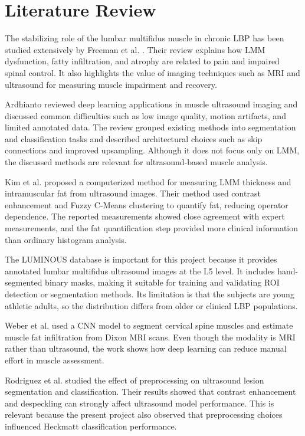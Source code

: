 ﻿\documentclass[12pt,a4paper]{report}
\begin{document}
\chapter{Literature Review}
\label{chap:literature_review}
\label{relatedwork}
The stabilizing role of the lumbar multifidus muscle in chronic LBP has been studied extensively by Freeman et al. \cite{Freeman2010}. Their review explains how LMM dysfunction, fatty infiltration, and atrophy are related to pain and impaired spinal control. It also highlights the value of imaging techniques such as MRI and ultrasound for measuring muscle impairment and recovery.

Ardhianto \cite{DeepLearningChallenges2021} reviewed deep learning applications in muscle ultrasound imaging and discussed common difficulties such as low image quality, motion artifacts, and limited annotated data. The review grouped existing methods into segmentation and classification tasks and described architectural choices such as skip connections and improved upsampling. Although it does not focus only on LMM, the discussed methods are relevant for ultrasound-based muscle analysis.

Kim et al. \cite{Kim2020} proposed a computerized method for measuring LMM thickness and intramuscular fat from ultrasound images. Their method used contrast enhancement and Fuzzy C-Means clustering to quantify fat, reducing operator dependence. The reported measurements showed close agreement with expert measurements, and the fat quantification step provided more clinical information than ordinary histogram analysis.

The LUMINOUS database \cite{Belasso2020} is important for this project because it provides annotated lumbar multifidus ultrasound images at the L5 level. It includes hand-segmented binary masks, making it suitable for training and validating ROI detection or segmentation methods. Its limitation is that the subjects are young athletic adults, so the distribution differs from older or clinical LBP populations.

Weber et al. \cite{Weber2021} used a CNN model to segment cervical spine muscles and estimate muscle fat infiltration from Dixon MRI scans. Even though the modality is MRI rather than ultrasound, the work shows how deep learning can reduce manual effort in muscle assessment.

Rodriguez et al. \cite{Rodriguez2017} studied the effect of preprocessing on ultrasound lesion segmentation and classification. Their results showed that contrast enhancement and despeckling can strongly affect ultrasound model performance. This is relevant because the present project also observed that preprocessing choices influenced Heckmatt classification performance.
\end{document}
